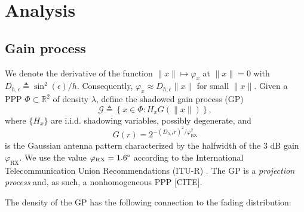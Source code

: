 \documentclass[conference]{IEEEtran}
\newcommand{\R}{\mathbb{R}}
\theoremstyle{definition}
\theoremstyle{plain}
\begin{document}
      
          \section{Analysis}

          \subsection{Gain process}
          We denote the derivative of the function $\|x\| \mapsto \varphi_x $ at $\|x\| =0$ with $D_{h,\epsilon} \triangleq \sin^2(\epsilon)/h$. Consequently, $\varphi_x \approx D_{h,\epsilon}\|x\|$ for small $\|x\|$.
          Given a PPP $\Phi \subset \R^2$ of density $\lambda$, define the shadowed gain process (GP)
          \begin{equation}
            \label{eq:gainprocess}
            \mathcal{G} \triangleq \left\{x \in \Phi : H_x G(\|x\|) \right\},
          \end{equation}
          where $\{H_x\}$ are i.i.d. shadowing variables, possibly degenerate, and 
          \begin{equation}
            G(r) = 2^{-(D_{h,\epsilon}r)^2/\varphi^2_{\text{RX}}}
          \end{equation}
          is the Gaussian antenna pattern characterized by the halfwidth of the $3$ dB gain $\varphi_{\text{RX}}$. We use the value $\varphi_{\text{RX}} = 1.6 \degree$ according to the International Telecommunication Union Recommendations (ITU-R) \cite{ITURS1528}. The GP is a \textit{projection process} and, as such, a nonhomogeneous PPP [CITE].

            The density of the GP has the following connection to the fading distribution:
\end{document}
